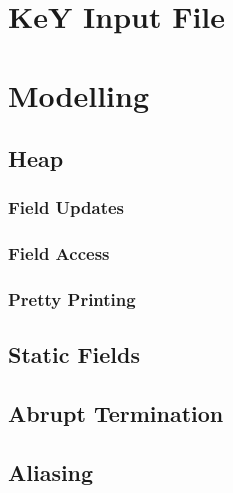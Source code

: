 \documentclass[a4paper, 11pt, accentcolor = tud3b]{tudreport}
\begin{document}
        \section{KeY Input File} %

        \section{Modelling} %

            \subsection{Heap} %

                \subsubsection{Field Updates} %

                \subsubsection{Field Access} %

                \subsubsection{Pretty Printing} %

            \subsection{Static Fields} %

            \subsection{Abrupt Termination} %

            \subsection{Aliasing} %
\end{document}
